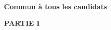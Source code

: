 
\textbf{Commun à tous les candidats}
\medskip

%
%
%
%
%
%
%

\medskip

\textbf{PARTIE I}

\medskip

